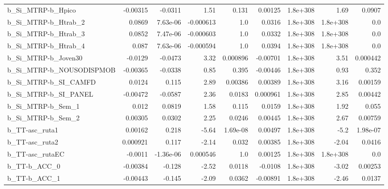 \begin{tabular}{lrrrrrrrr}
b\_Si\_MTRP-b\_Hpico            &    -0.00315 &      -0.0311 &      1.51 &    0.131 &    0.00125 &    1.8e+308 &         1.69 &        0.0907 \\
b\_Si\_MTRP-b\_Htrab\_2          &      0.0869 &     7.63e-06 & -0.000613 &      1.0 &     0.0316 &    1.8e+308 &     1.8e+308 &           0.0 \\
b\_Si\_MTRP-b\_Htrab\_3          &      0.0852 &     7.47e-06 & -0.000603 &      1.0 &     0.0332 &    1.8e+308 &     1.8e+308 &           0.0 \\
b\_Si\_MTRP-b\_Htrab\_4          &       0.087 &     7.63e-06 & -0.000594 &      1.0 &     0.0394 &    1.8e+308 &     1.8e+308 &           0.0 \\
b\_Si\_MTRP-b\_Joven30          &     -0.0129 &      -0.0473 &      3.32 & 0.000896 &   -0.00701 &    1.8e+308 &         3.51 &      0.000442 \\
b\_Si\_MTRP-b\_NOUSODISPMOB     &    -0.00365 &      -0.0338 &      0.85 &    0.395 &   -0.00446 &    1.8e+308 &         0.93 &         0.352 \\
b\_Si\_MTRP-b\_SI\_CAMFD         &      0.0124 &        0.115 &      2.89 &  0.00386 &    0.00389 &    1.8e+308 &         3.16 &       0.00159 \\
b\_Si\_MTRP-b\_SI\_PANEL         &    -0.00472 &      -0.0587 &      2.36 &   0.0183 &   0.000961 &    1.8e+308 &         2.85 &       0.00442 \\
b\_Si\_MTRP-b\_Sem\_1            &       0.012 &       0.0819 &      1.58 &    0.115 &     0.0159 &    1.8e+308 &         1.92 &         0.055 \\
b\_Si\_MTRP-b\_Sem\_2            &     0.00305 &       0.0302 &      2.25 &   0.0246 &    0.00445 &    1.8e+308 &         2.67 &       0.00759 \\
b\_TT-asc\_ruta1               &     0.00162 &        0.218 &     -5.64 & 1.69e-08 &    0.00497 &    1.8e+308 &         -5.2 &      1.98e-07 \\
b\_TT-asc\_ruta2               &    0.000921 &        0.117 &     -2.14 &    0.032 &    0.00385 &    1.8e+308 &        -2.04 &        0.0416 \\
b\_TT-asc\_rutaEC              &     -0.0011 &    -1.36e-06 &  0.000546 &      1.0 &    0.00125 &    1.8e+308 &     1.8e+308 &           0.0 \\
b\_TT-b\_ACC\_0                 &    -0.00384 &       -0.128 &     -2.52 &   0.0118 &    -0.0108 &    1.8e+308 &        -3.02 &       0.00253 \\
b\_TT-b\_ACC\_1                 &    -0.00443 &       -0.145 &     -2.09 &   0.0362 &   -0.00891 &    1.8e+308 &        -2.46 &        0.0137 \\

\end{tabular}
